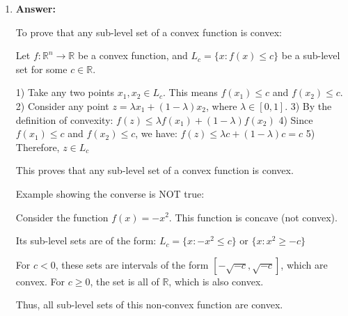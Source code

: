 \documentclass{article}
\newenvironment{answer}
    {\par\noindent\textbf{Answer:}\par}
    {\par}
\begin{document}
\begin{enumerate}
\begin{enumerate}
\begin{answer}
\begin{center}
        \end{center}

        This example demonstrates that while $A$ and $B$ are disjoint closed convex sets, they cannot be strictly separated because they get arbitrarily close to each other as $x \to -\infty$.
        \end{answer}
        \item 
        \begin{answer}
        To prove that any sub-level set of a convex function is convex:
    
        Let $f: \mathbb{R}^n \to \mathbb{R}$ be a convex function, and $L_c = \{x : f(x) \leq c\}$ be a sub-level set for some $c \in \mathbb{R}$.
    
        1) Take any two points $x_1, x_2 \in L_c$. This means $f(x_1) \leq c$ and $f(x_2) \leq c$.
        2) Consider any point $z = \lambda x_1 + (1-\lambda)x_2$, where $\lambda \in [0,1]$.
        3) By the definition of convexity: $f(z) \leq \lambda f(x_1) + (1-\lambda)f(x_2)$
        4) Since $f(x_1) \leq c$ and $f(x_2) \leq c$, we have:
           $f(z) \leq \lambda c + (1-\lambda)c = c$
        5) Therefore, $z \in L_c$
    
        This proves that any sub-level set of a convex function is convex.
    
        Example showing the converse is NOT true:
    
        Consider the function $f(x) = -x^2$. This function is concave (not convex).
    
        Its sub-level sets are of the form:
        $L_c = \{x : -x^2 \leq c\}$ or $\{x : x^2 \geq -c\}$
    
        For $c < 0$, these sets are intervals of the form $[-\sqrt{-c}, \sqrt{-c}]$, which are convex.
        For $c \geq 0$, the set is all of $\mathbb{R}$, which is also convex.
    
        Thus, all sub-level sets of this non-convex function are convex.
    

\end{answer}
\end{enumerate}
\end{enumerate}
\end{document}
